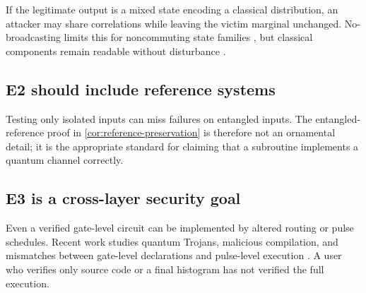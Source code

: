 If the legitimate output is a mixed state encoding a classical distribution,
an attacker may share correlations while leaving the victim marginal unchanged.
No-broadcasting limits this for noncommuting state families
\cite{barnum1996broadcasting}, but classical components remain readable without
disturbance \cite{koashi2002operations}.

\subsection{E2 should include reference systems}

Testing only isolated inputs can miss failures on entangled inputs. The
entangled-reference proof in \cref{cor:reference-preservation} is therefore not
an ornamental detail; it is the appropriate standard for claiming that a
subroutine implements a quantum channel correctly.

\subsection{E3 is a cross-layer security goal}

Even a verified gate-level circuit can be implemented by altered routing or
pulse schedules. Recent work studies quantum Trojans, malicious compilation,
and mismatches between gate-level declarations and pulse-level execution
\cite{ashsaki2023primer,john2025trojan,xu2024pulseattacks}. A user who verifies
only source code or a final histogram has not verified the full execution.
